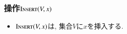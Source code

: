 \documentclass[main]{subfiles}
\begin{document}
\begin{frame}\frametitle{操作$\mathrm{\text{I\textsc{nsert}}}(V,x)$}
\begin{itemize}
	\item $\mathrm{\text{I\textsc{nsert}}}(V,x)$は, 集合$V$に$x$を挿入する.\\
\end{itemize}

\begin{columns}[c]
	\begin{column}{0.5\linewidth}
		
	\end{column}
	\begin{column}{0.49\linewidth}
		
	\end{column}
\end{columns}
\end{frame}
\end{document}
